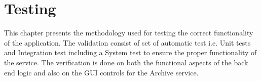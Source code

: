 \chapter{Testing}
This chapter presents the methodology used for testing the correct functionality of the application. The validation consist of set of automatic test i.e.
Unit tests and Integration test including a System test to ensure the proper functionality of the service. The verification is done on both the functional
aspects of the back end logic and also on the GUI controls for the Archive service.



